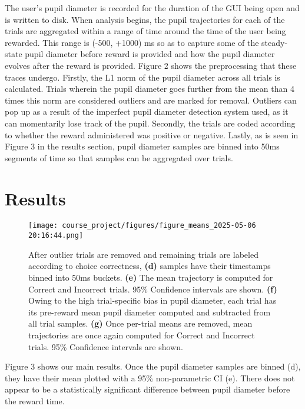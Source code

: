 \documentclass[10pt,letterpaper]{article}
\begin{document}
The user's pupil diameter is recorded for the duration of the GUI being open and is written to disk. When analysis begins, the pupil trajectories for each of the trials are aggregated within a range of time around the time of the user being rewarded. This range is (-500, +1000) ms so as to capture some of the steady-state pupil diameter before reward is provided and how the pupil diameter evolves after the reward is provided. Figure 2 shows the preprocessing that these traces undergo. Firstly, the L1 norm of the pupil diameter across all trials is calculated. Trials wherein the pupil diameter goes further from the mean than 4 times this norm are considered outliers and are marked for removal. Outliers can pop up as a result of the imperfect pupil diameter detection system used, as it can momentarily lose track of the pupil. Secondly, the trials are coded according to whether the reward administered was positive or negative. Lastly, as is seen in Figure 3 in the results section, pupil diameter samples are binned into 50ms segments of time so that samples can be aggregated over trials.

\section{Results}

\begin{figure*}[h]
    \centering
    \texttt{[image: course\_project/figures/figure\_means\_2025-05-06 20:16:44.png]}
    \caption{After outlier trials are removed and remaining trials are labeled according to choice correctness, 
    \textbf{(d)} samples have their timestamps binned into 50ms buckets.
    \textbf{(e)} The mean trajectory is computed for Correct and Incorrect trials. 95\% Confidence intervals are shown.
    \textbf{(f)} Owing to the high trial-specific bias in pupil diameter, each trial has its pre-reward mean pupil diameter computed and subtracted from all trial samples.
    \textbf{(g)} Once per-trial means are removed, mean trajectories are once again computed for Correct and Incorrect trials. 95\% Confidence intervals are shown.
    }
    \label{fig:enter-label}
\end{figure*}
Figure 3 shows our main results. Once the pupil diameter samples are binned (d), they have their mean plotted with a 95\% non-parametric CI (e). There does not appear to be a statistically significant difference between pupil diameter before the reward time.
\end{document}
